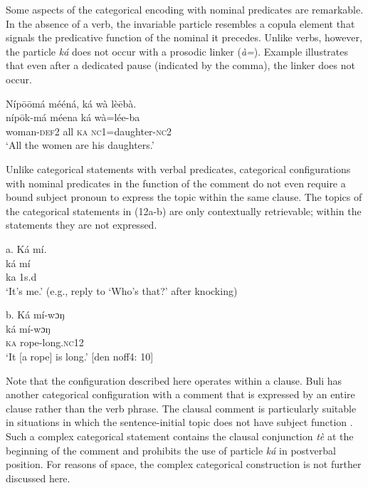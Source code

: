 \documentclass[output=paper]{langsci/langscibook}
\begin{document}
Some aspects of the categorical encoding with nominal predicates are remarkable. In the absence of a verb, the invariable particle resembles a copula element that signals the predicative function of the nominal it precedes. Unlike verbs, however, the particle \textit{ká} does not occur with a prosodic linker (\textit{à=}). Example  illustrates that even after a dedicated pause (indicated by the comma), the linker does not occur.

\ea
\glll \textup{}  \textup{Níp\={o}\={o}má  mééná,    ká  wà  lè\={e}bà.}\\
  \textup{  níp\={o}k-má  méena    ká  wà=lée-ba}\\
       woman-\textsc{def}2  all    \textsc{ka}  \textsc{nc}1=daughter-\textsc{nc}2\\
\glt ‘All the women are his daughters.’ \citep[268]{Schwarz2009}
\z

Unlike categorical statements with verbal predicates, categorical configurations with nominal predicates in the function of the comment do not even require a bound subject pronoun to express the topic within the same clause. The topics of the categorical statements in (12a-b) are only contextually retrievable; within the statements they are not expressed.     

\ea
\glll \textup{}  \textup{a.}  Ká  mí.\\
  \textup{ká  mí}\\
     ka  1s.d\\
\glt   ‘It’s me.’ (e.g., reply to ‘Who’s that?’ after knocking) \citep[269]{Schwarz2009}
\z

\ea
\glll         \textup{ b.}  Ká  mí-wɔŋ\\
  \textup{ká  mí-wɔŋ}\\
     \textsc{ka}  rope-long.\textsc{nc}12\\
\glt   ‘It [a rope] is long.’ [den noff4: 10]
\z

Note that the configuration described here operates within a clause. Buli has another categorical configuration with a comment that is expressed by an entire clause rather than the verb phrase. The clausal comment is particularly suitable in situations in which the sentence-initial topic does not have subject function . Such a complex categorical statement contains the clausal conjunction \textit{tè} at the beginning of the comment and prohibits the use of particle \textit{ká} in postverbal position. For reasons of space, the complex categorical construction is not further discussed here.
\end{document}
